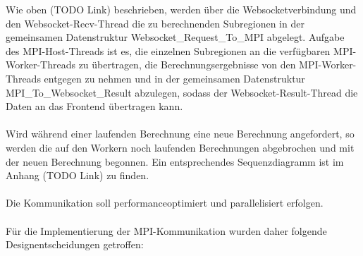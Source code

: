 Wie oben (TODO Link) beschrieben, werden über die Websocketverbindung und den Websocket-Recv-Thread die zu berechnenden Subregionen in der gemeinsamen Datenstruktur Websocket\_Request\_To\_MPI abgelegt. Aufgabe des MPI-Host-Threads ist es, die einzelnen Subregionen an die verfügbaren MPI-Worker-Threads zu übertragen, die Berechnungsergebnisse von den MPI-Worker-Threads entgegen zu nehmen und in der gemeinsamen Datenstruktur MPI\_To\_Websocket\_Result abzulegen, sodass der Websocket-Result-Thread die Daten an das Frontend übertragen kann.
\\ \\
Wird während einer laufenden Berechnung eine neue Berechnung angefordert, so werden die auf den Workern noch laufenden Berechnungen abgebrochen und mit der neuen Berechnung begonnen. Ein entsprechendes Sequenzdiagramm ist im Anhang (TODO Link) zu finden.
\\ \\
Die Kommunikation soll performanceoptimiert und parallelisiert erfolgen.
\\ \\
Für die Implementierung der MPI-Kommunikation wurden daher folgende Designentscheidungen getroffen:


